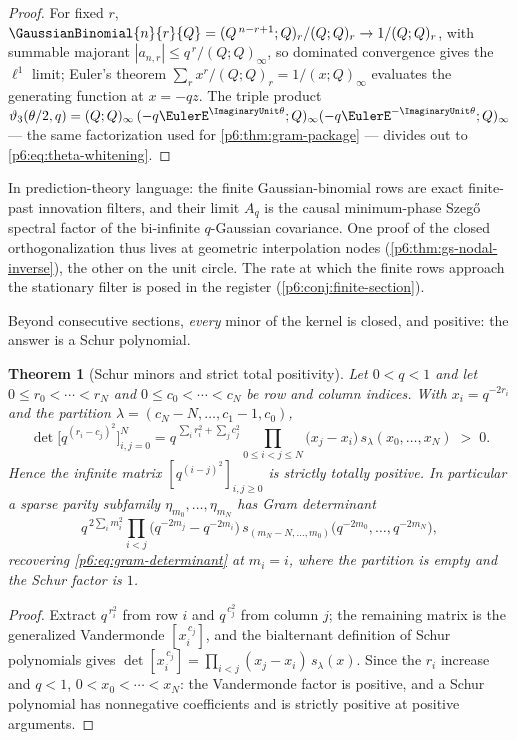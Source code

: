 \documentclass[11pt,oneside]{article}
\numberwithin{equation}{section}
\newtheorem{theorem}{Theorem}[section]
\theoremstyle{definition}
\theoremstyle{remark}
\begin{document}
\begin{proof}
For fixed $r$,
$\GaussianBinomial{n}{r}{Q}=(Q^{\,n-r+1};Q)_r/(Q;Q)_r\to1/(Q;Q)_r$, with summable
majorant $|a_{n,r}|\le q^{\,r}/(Q;Q)_\infty$, so dominated convergence
gives the $\ell^1$ limit; Euler's theorem
$\sum_rx^r/(Q;Q)_r=1/(x;Q)_\infty$ evaluates the generating function at
$x=-qz$.  The triple product
$\vartheta_3(\theta/2,q)
=(Q;Q)_\infty\,(-q\EulerE^{\ImaginaryUnit\theta};Q)_\infty(-q\EulerE^{-\ImaginaryUnit\theta};Q)_\infty$
--- the same factorization used for \cref{p6:thm:gram-package} --- divides
out to \eqref{p6:eq:theta-whitening}.
\end{proof}

In prediction-theory language: the finite Gaussian-binomial rows are exact
finite-past innovation filters, and their limit $A_q$ is the causal
minimum-phase Szeg\H{o} spectral factor of the bi-infinite $q$-Gaussian
covariance.  One proof of the closed orthogonalization thus lives at
geometric interpolation nodes (\cref{p6:thm:gs-nodal-inverse}), the other
on the unit circle.  The rate at which the finite rows approach the
stationary filter is posed in the register
(\cref{p6:conj:finite-section}).

Beyond consecutive sections, \emph{every} minor of the kernel is closed,
and positive: the answer is a Schur polynomial.

\begin{theorem}[Schur minors and strict total positivity]
\label{p6:thm:schur-minors}
Let $0<q<1$ and let $0\le r_0<\cdots<r_N$ and $0\le c_0<\cdots<c_N$ be row
and column indices.  With $x_i=q^{-2r_i}$ and the partition
$\lambda=(c_N-N,\ldots,c_1-1,c_0)$,
\begin{equation}\label{p6:eq:schur-minor}
 \boxed{\ \det\bigl[q^{(r_i-c_j)^2}\bigr]_{i,j=0}^{N}
 =q^{\,\sum_ir_i^2+\sum_jc_j^2}
 \prod_{0\le i<j\le N}\!\bigl(x_j-x_i\bigr)\,
 s_\lambda(x_0,\ldots,x_N)\;>\;0.\ }
\end{equation}
Hence the infinite matrix $[q^{(i-j)^2}]_{i,j\ge0}$ is strictly totally
positive.  In particular a sparse parity subfamily
$\eta_{m_0},\ldots,\eta_{m_N}$ has Gram determinant
\[
 q^{\,2\sum_im_i^2}
 \prod_{i<j}\bigl(q^{-2m_j}-q^{-2m_i}\bigr)\,
 s_{(m_N-N,\ldots,m_0)}\bigl(q^{-2m_0},\ldots,q^{-2m_N}\bigr),
\]
recovering \eqref{p6:eq:gram-determinant} at $m_i=i$, where the partition
is empty and the Schur factor is $1$.
\end{theorem}

\begin{proof}
Extract $q^{\,r_i^2}$ from row $i$ and $q^{\,c_j^2}$ from column $j$; the
remaining matrix is the generalized Vandermonde $[x_i^{\,c_j}]$, and the
bialternant definition of Schur polynomials gives
$\det[x_i^{\,c_j}]=\prod_{i<j}(x_j-x_i)\,s_\lambda(x)$.  Since the $r_i$
increase and $q<1$, $0<x_0<\cdots<x_N$: the Vandermonde factor is
positive, and a Schur polynomial has nonnegative coefficients and is
strictly positive at positive arguments.
\end{proof}
\end{document}
